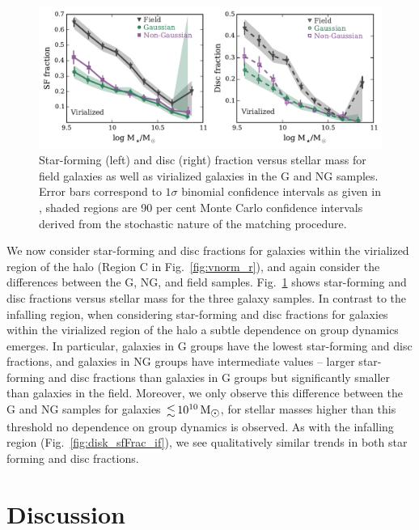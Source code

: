 \documentclass[a4paper,fleqn,usenatbib]{mnras}
\newcommand{\Msun}{\,\mathrm{M_{\sun}}}
\begin{document}
\begin{figure}
  \centering
  \includegraphics[width=\textwidth]{disk_sfFrac95_w2_v.pdf}
  \caption{Star-forming (left) and disc (right) fraction versus stellar mass for
    field galaxies as well as virialized galaxies in the G and NG
    samples.  Error bars correspond to $1 \sigma$ binomial confidence
    intervals as given in \citet{cameron2011}, shaded regions are 90
    per cent Monte Carlo confidence intervals derived from the
    stochastic nature of the matching procedure.}
  \label{fig:disk_sfFrac_v}
\end{figure}

We now consider star-forming and disc fractions for galaxies within
the virialized region of the halo (Region C in
Fig.~\ref{fig:vnorm_r}), and again consider the differences between
the G, NG, and field samples.  Fig.~\ref{fig:disk_sfFrac_v} shows
star-forming and disc fractions versus stellar mass for the three
galaxy samples.  In contrast to the infalling region, when
considering star-forming and
disc fractions for galaxies within the virialized region of the halo a
subtle dependence 
on group dynamics emerges.  In particular, galaxies in G groups have
the lowest star-forming and 
disc fractions, and galaxies in NG groups have intermediate
values -- larger star-forming and disc fractions than galaxies in G
groups but significantly smaller than galaxies in the field.
Moreover, we only observe this difference between the G and NG samples
for galaxies $\la 10^{10}\Msun$, for stellar masses higher than this
threshold no dependence on group dynamics is observed.  As with the
infalling region (Fig.~\ref{fig:disk_sfFrac_if}), we see qualitatively
similar trends in both star forming and disc fractions.


\section{Discussion}
\label{sec:discussion}
\end{document}
